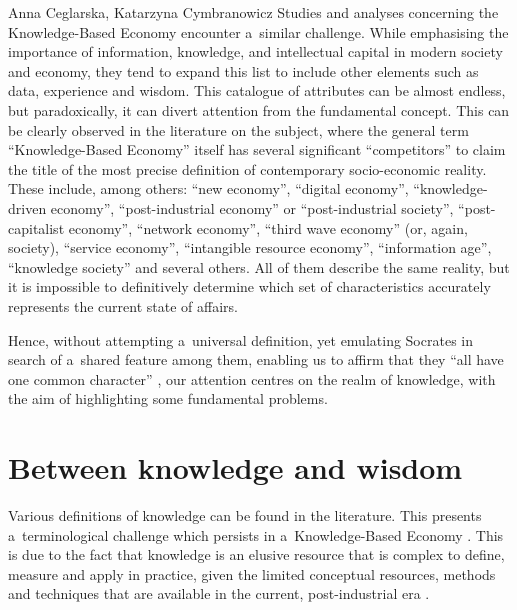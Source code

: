 \begin{artengenv2auth}{Anna Ceglarska, Katarzyna Cymbranowicz}
 Studies and analyses concerning the Knowledge-Based Economy encounter a~similar challenge. While emphasising the importance of information, knowledge, and intellectual capital in modern society and economy, they tend to expand this list to include other elements such as data, experience and wisdom. This catalogue of attributes can be almost endless, but paradoxically, it can divert attention from the fundamental concept. This can be clearly observed in the literature on the subject, where the general term ``Knowledge-Based Economy'' itself has several significant ``competitors'' to claim the title of the most precise definition of contemporary socio-economic reality. These include, among others: ``new economy'', ``digital economy'', ``knowledge-driven economy'', ``post-industrial economy'' or ``post-industrial society'', ``post-capitalist economy'', ``network economy'', ``third wave economy'' (or, again, society), ``service economy'', ``intangible resource economy'', ``information age'', ``knowledge society'' and several others. All of them describe the same reality, but it is impossible to definitively determine which set of characteristics accurately represents the current state of affairs.



Hence, without attempting a~universal definition, yet emulating Socrates in search of a~shared feature among them, enabling us to affirm that they ``all have one common character'' 
\parencite[][72c]{plato_plato_1967}, %
 our attention centres on the realm of knowledge, with the aim of highlighting some fundamental problems.



\section{Between knowledge and wisdom}

Various definitions of knowledge can be found in the literature. This presents a~terminological challenge which persists in a~Knowledge-Based Economy 
\parencites[][]{teece_knowledge_1987}[][]{oecd_knowledge_2000}. %
 This is due to the fact that knowledge is an elusive resource that is complex to define, measure and apply in practice, given the limited conceptual resources, methods and techniques that are available in the current, post-industrial era 
\parencite[][p.20]{strojny_zarzadzanie_2000}.%





\end{artengenv2auth}
